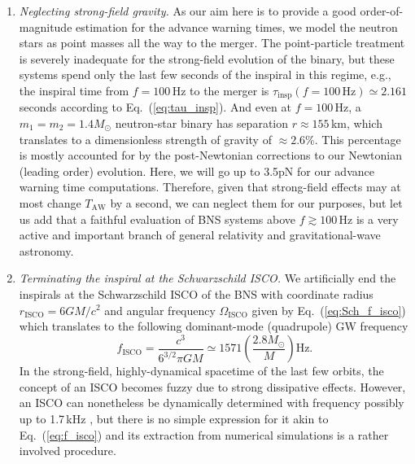 \documentclass[prd,amsmath,amssymb,aps,floats,amsfonts,notitlepage,superscriptaddress,eqsecnum,nofootinbib,10pt]{revtex4-1}
\newcommand{\f}{\frac}
\newcommand{\be}{\begin{equation}}
\newcommand{\ee}{\end{equation}}
\begin{document}
\begin{enumerate}
 \item {\it Neglecting strong-field gravity.}
As our aim here is to provide a good order-of-magnitude estimation for the advance warning times, we model the neutron stars as point masses %
all the way to the merger. The point-particle treatment is severely inadequate for the strong-field evolution of the binary, but these systems spend only the last few seconds of the inspiral in this regime, e.g., the inspiral time from $f=100\,$Hz to the merger is
$\tau_\text{insp}(f=100\,\text{Hz})\simeq 2.161\,$seconds according to Eq.~(\ref{eq:tau_insp}).
And even at $f=100\,$Hz, a $m_1=m_2=1.4M_\odot$ neutron-star binary has separation $r\approx 155\,$km, which translates to a dimensionless strength of gravity of $\approx 2.6\%$.
This percentage is mostly accounted for by the post-Newtonian
corrections to our Newtonian (leading order) evolution. 
Here, we will go up to 3.5pN for our
advance warning time computations.
Therefore, given that strong-field effects may at most change
$T_\text{AW}$ by a second, we can neglect them for our purposes,
but let us add that a faithful evaluation of BNS systems above $f\gtrsim 100\,$Hz is a very active and important branch of general relativity and gravitational-wave astronomy. %
%
\item {\it Terminating the inspiral at the Schwarzschild ISCO.}
We artificially end the inspirals at the Schwarzschild ISCO of the BNS with coordinate radius $r_\text{ISCO} = 6GM/c^2$ and angular frequency $\Omega_\text{ISCO}$ %
given by Eq.~(\ref{eq:Sch_f_isco}) which translates to the following dominant-mode (quadrupole) GW frequency
\be
f_\text{ISCO} = \f{c^3}{6^{3/2}\pi G M} \simeq 1571 \left(\f{2.8M_\odot}{M}\right)\text{Hz} \label{eq:f_isco}.
\ee
In the strong-field, highly-dynamical spacetime of the last few orbits, the
concept of an ISCO becomes fuzzy due to strong dissipative effects. However, an ISCO can nonetheless be dynamically determined
with frequency possibly up to 1.7\,kHz \cite{Marronetti:2003hx}, 
but there is no simple expression for it akin to Eq.~(\ref{eq:f_isco}) and its extraction from numerical simulations is a rather involved procedure.

\end{enumerate}
\end{document}
